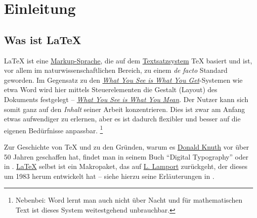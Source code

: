 \thispagestyle{empty}
\section{Einleitung}
% 
\subsection{Was ist \LaTeX{}}
\LaTeX{} ist eine \href{https://de.wikipedia.org/wiki/Auszeichnungssprache}{Markup-Sprache}, die auf dem \href{https://de.wikipedia.org/wiki/Satz_(Druck)}{Textsatzsystem} \TeX{} basiert und ist, vor allem im naturwissenschaftlichen Bereich, zu einem \emph{de facto} Standard geworden.
Im Gegensatz zu den \href{https://de.wikipedia.org/wiki/WYSIWYG}{\emph{What You See is What You Get}}-Systemen wie etwa Word wird hier mittels Steuerelementen die Gestalt (Layout) des Dokuments festgelegt 
-- \href{https://de.wikipedia.org/wiki/WYSIWYM}{\emph{What You See is What You Mean}}.
Der Nutzer kann sich somit ganz auf den \emph{Inhalt} seiner Arbeit konzentrieren.
Dies ist zwar am Anfang etwas aufwendiger zu erlernen, aber es ist dadurch flexibler und besser auf die eigenen Bedürfnisse anpassbar.%
\footnote{Nebenbei: Word lernt man auch nicht über Nacht und für mathematischen Text ist dieses System weitestgehend unbrauchbar.}

Zur Geschichte von \TeX{} und zu den Gründen, warum es \href{https://de.wikipedia.org/wiki/Donald_E._Knuth}{Donald Knuth} vor über 50 Jahren geschaffen hat, findet man in seinem Buch \enquote{Digital Typography} \cite{knuth:digital} oder in \textcite{beeton:math}.
\href{https://de.wikipedia.org/wiki/LaTeX}{\LaTeX{}} selbst ist ein Makropaket, das auf \href{https://de.wikipedia.org/wiki/Leslie_Lamport}{L. Lamport} zurückgeht, der dieses um 1983 herum entwickelt hat -- siehe hierzu seine Erläuterungen in \cite{lamport:dmv}.

